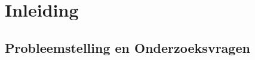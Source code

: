 
\chapter{Inleiding}
\label{ch:inleiding}






\section{Probleemstelling en Onderzoeksvragen}
\label{sec:onderzoeksvragen}



